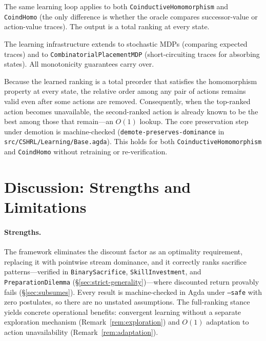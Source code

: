 \documentclass[runningheads]{llncs}
\newcommand{\fpath}[1]{\nolinkurl{#1}}
\begin{document}
The same learning loop applies to both \texttt{CoinductiveHomomorphism} and \texttt{CoindHomo} (the only difference is whether the oracle compares successor-value or action-value traces). The output is a total ranking at every state.

The learning infrastructure extends to stochastic MDPs (comparing expected traces) and to \texttt{CombinatorialPlacementMDP} (short-circuiting traces for absorbing states). All monotonicity guarantees carry over.

\begin{remark}\label{rem:adaptation}
Because the learned ranking is a total preorder that satisfies the homomorphism property at every state, the relative order among any pair of actions remains valid even after some actions are removed.  Consequently, when the top-ranked action becomes unavailable, the second-ranked action is already known to be the best among those that remain---an $O(1)$ lookup.  The core preservation step under demotion is machine-checked (\texttt{demote-preserves-dominance} in \fpath{src/CSHRL/Learning/Base.agda}).  This holds for both \texttt{CoinductiveHomomorphism} and \texttt{CoindHomo} without retraining or re-verification.
\end{remark}

\section{Discussion: Strengths and Limitations}\label{sec:discussion}

\paragraph{Strengths.}
The framework eliminates the discount factor as an optimality requirement, replacing it with pointwise stream dominance, and it correctly ranks sacrifice patterns---verified in \texttt{BinarySacrifice}, \texttt{SkillInvestment}, and \texttt{PreparationDilemma} (\S\ref{sec:strict-generality})---where discounted return provably fails (\S\ref{sec:subsumes}).  Every result is machine-checked in Agda under \texttt{--safe} with zero postulates, so there are no unstated assumptions.  The full-ranking stance yields concrete operational benefits: convergent learning without a separate exploration mechanism (Remark~\ref{rem:exploration}) and $O(1)$ adaptation to action unavailability (Remark~\ref{rem:adaptation}).
\end{document}
